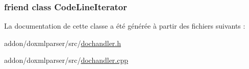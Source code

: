 \subsubsection[{Code\+Line\+Iterator}]{\setlength{\rightskip}{0pt plus 5cm}friend class {\bf Code\+Line\+Iterator}\hspace{0.3cm}{\ttfamily [friend]}}\label{class_code_line_handler_a58edddfb3f15948fd8e3e8c67db55d01}


La documentation de cette classe a été générée à partir des fichiers suivants \+:\begin{DoxyCompactItemize}
\item 
addon/doxmlparser/src/\hyperlink{dochandler_8h}{dochandler.\+h}\item 
addon/doxmlparser/src/\hyperlink{dochandler_8cpp}{dochandler.\+cpp}\end{DoxyCompactItemize}
